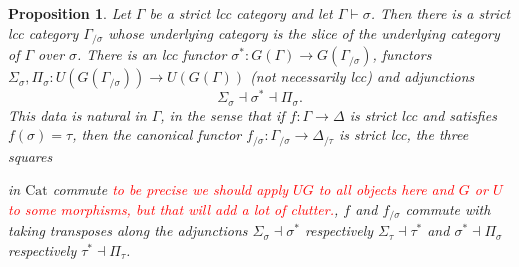 \documentclass{article}
\newcommand{\todo}[1]{\textcolor{red}{#1}}
\newtheorem{proposition}{Proposition}
\theoremstyle{remark}
\theoremstyle{definition}
\begin{document}
\begin{proposition}
  \label{prop:strict-slicing}
  Let $\Gamma$ be a strict lcc category and let $\Gamma \vdash \sigma$.
  Then there is a strict lcc category $\Gamma_{/ \sigma}$ whose underlying category is the slice of the underlying category of $\Gamma$ over $\sigma$.
  There is an lcc functor $\sigma^* : G(\Gamma) \rightarrow G(\Gamma_{/ \sigma})$, functors $\Sigma_\sigma, \Pi_\sigma : U(G(\Gamma_{/ \sigma})) \rightarrow U(G(\Gamma))$ (not necessarily lcc) and adjunctions
  \begin{equation}
    \Sigma_\sigma \dashv \sigma^* \dashv \Pi_\sigma.
  \end{equation}
  This data is natural in $\Gamma$, in the sense that if $f : \Gamma \rightarrow \Delta$ is strict lcc and satisfies $f(\sigma) = \tau$, then the canonical functor $f_{/ \sigma} : \Gamma_{/ \sigma} \rightarrow \Delta_{/ \tau}$ is strict lcc, the three squares
  in $\mathrm{Cat}$ commute \todo{to be precise we should apply $UG$ to all objects here and $G$ or $U$ to some morphisms, but that will add a lot of clutter.}, $f$ and $f_{/ \sigma}$ commute with taking transposes along the adjunctions $\Sigma_\sigma \dashv \sigma^*$ respectively $\Sigma_\tau \dashv \tau^*$ and $\sigma^* \dashv \Pi_\sigma$ respectively $\tau^* \dashv \Pi_\tau$.
\end{proposition}
\end{document}
